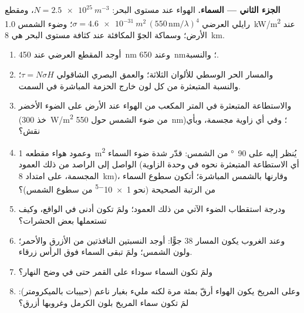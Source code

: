 \begin{problem}
\medskip
\noindent\textbf{الجزء الثاني --- السماء.}
الهواء عند مستوى البحر: $N = \qty{2.5e25}{m^{-3}}$، ومقطع رايلي العرضي $\sigma =
\qty{4.6e-31}{m^2}\,(550\,\text{nm}/\lambda)^4$؛ وضوء الشمس \qty{1.0}{kW/m^2} عند
الأرض؛ وسماكة الجوّ المكافئة عند كثافة مستوى البحر هي
\qty{8}{km}.
\begin{enumerate}[resume]
  \item أوجد المقطع العرضي عند \qty{450}{nm} وعند \qty{650}{nm}؛ والنسبة.
  \item والمسار الحر الوسطي للألوان الثلاثة؛ والعمق البصري الشاقولي
        $\tau = N\sigma H$؛ والنسبة المتبعثرة من كل لون خارج
        الحزمة المباشرة في السمت.
  \item والاستطاعة المتبعثرة في المتر المكعب من الهواء عند الأرض على
        الضوء الأخضر (خذ \qty{300}{W/m^2} من ضوء الشمس حول
        \qty{550}{nm})؛ وفي أي زاوية مجسمة، وبأي نقش؟
  \item وعمود هواء مقطعه \qty{1}{m^2} يُنظر إليه على \qty{90}{\degree} من
        الشمس: قدّر شدة ضوء السماء الواصل إلى
        الراصد من ذلك العمود (أي الاستطاعة المتبعثرة نحوه في
        وحدة الزاوية المجسمة، على امتداد \qty{8}{km})، وقارنها
        بالشمس المباشرة؛ أتكون سطوع السماء من الرتبة الصحيحة
        (نحو \qty{1e-5}{} من سطوع الشمس)؟
  \item ودرجة استقطاب الضوء الآتي من ذلك العمود؛ ولمَ تكون
        أدنى في الواقع، وكيف تستعملها بعض الحشرات؟
  \item وعند الغروب يكون المسار $38$ جوًّا: أوجد النسبتين النافذتين
        من الأزرق والأحمر؛ ولون الشمس؛ ولمَ تبقى السماء فوق الرأس
        زرقاء.
  \item ولمَ تكون السماء سوداء على القمر حتى في وضح النهار؟
  \item وعلى المريخ يكون الهواء أرقّ بمئة مرة لكنه مليء بغبار
        ناعم (حبيبات بالميكرومتر): لمَ تكون سماء المريخ
        بلون الكرمل وغروبها أزرق؟
\end{enumerate}


\end{problem}
